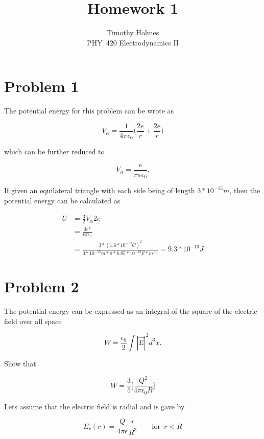 \documentclass[11pt]{article}
\newcommand{\HWnum}{1}
\newcommand{\Subject}{PHY}
\begin{document}

\title{Homework {\HWnum}}
\author{Timothy Holmes \\ \Subject~420 Electrodynamics II}

\maketitle

\section*{Problem 1}

The potential energy for this problem can be wrote as

$$
V_{\alpha} = \frac{1}{4\pi \epsilon_{0}} \Bigg( \frac{2e}{r} + \frac{2e}{r}\Bigg)
$$

which can be further reduced to 

$$
V_{\alpha} = \frac{e}{r\pi \epsilon_{0}}.
$$

If given an equilateral triangle with each side being of length $3*10^{-15}m$, then the potential energy can be calculated as

\begin{align*}
    U &= \frac{3}{2} V_{\alpha} 2e \\
    &= \frac{3e^{2}}{r\pi\epsilon_{0}} \\
    & = \frac{3*(1.6*10^{-19}C)^{2}}{3*10^{-15}m*\pi*8.85*10^{-12}F*m^{-1}} = 9.3*10^{-13} J
\end{align*}

\clearpage

\section*{Problem 2}

The potential energy can be expressed as an integral of the square of the electric field over all space

$$
W = \frac{\epsilon_{0}}{2} \int |\vec{E}|^{2} d^{3}x.
$$

Show that

$$
W = \frac{3}{5} \Bigg[ \frac{Q^{2}}{4 \pi \epsilon_{0} R} \Bigg]
$$

Lets assume that the electric field is radial and is gave by

$$
E_{r}(r) = \frac{Q}{4\pi\epsilon} \frac{r}{R^{3}} \qquad \text{for} \enspace r < R
$$
\end{document}
